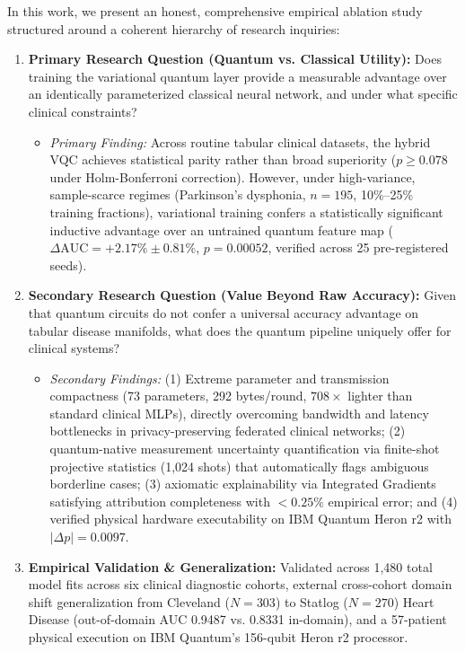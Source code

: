 \documentclass[conference]{IEEEtran}
\begin{document}
In this work, we present an honest, comprehensive empirical ablation study structured around a coherent hierarchy of research inquiries:
\begin{enumerate}
    \item \textbf{Primary Research Question (Quantum vs. Classical Utility):} Does training the variational quantum layer provide a measurable advantage over an identically parameterized classical neural network, and under what specific clinical constraints?
    \begin{itemize}
        \item \textit{Primary Finding:} Across routine tabular clinical datasets, the hybrid VQC achieves statistical parity rather than broad superiority ($p \ge 0.078$ under Holm-Bonferroni correction). However, under high-variance, sample-scarce regimes (Parkinson's dysphonia, $n=195$, 10\%--25\% training fractions), variational training confers a statistically significant inductive advantage over an untrained quantum feature map ($\Delta\text{AUC} = +2.17\% \pm 0.81\%$, $p = 0.00052$, verified across 25 pre-registered seeds).
    \end{itemize}
    \item \textbf{Secondary Research Question (Value Beyond Raw Accuracy):} Given that quantum circuits do not confer a universal accuracy advantage on tabular disease manifolds, what does the quantum pipeline uniquely offer for clinical systems?
    \begin{itemize}
        \item \textit{Secondary Findings:} (1) Extreme parameter and transmission compactness (73 parameters, 292 bytes/round, $708\times$ lighter than standard clinical MLPs), directly overcoming bandwidth and latency bottlenecks in privacy-preserving federated clinical networks; (2) quantum-native measurement uncertainty quantification via finite-shot projective statistics (1,024 shots) that automatically flags ambiguous borderline cases; (3) axiomatic explainability via Integrated Gradients satisfying attribution completeness with $<0.25\%$ empirical error; and (4) verified physical hardware executability on IBM Quantum Heron r2 with $|\Delta p| = 0.0097$.
    \end{itemize}
    \item \textbf{Empirical Validation \& Generalization:} Validated across 1,480 total model fits across six clinical diagnostic cohorts, external cross-cohort domain shift generalization from Cleveland ($N=303$) to Statlog ($N=270$) Heart Disease (out-of-domain AUC 0.9487 vs. 0.8331 in-domain), and a 57-patient physical execution on IBM Quantum's 156-qubit Heron r2 processor.
\end{enumerate}
\end{document}
